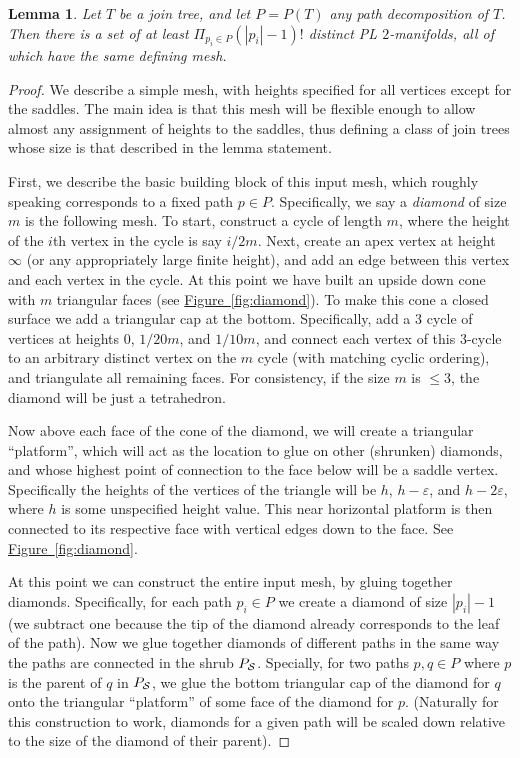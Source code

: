 \documentclass[11pt]{article}
\newtheorem{lemma}[theorem]{Lemma}
\theoremstyle{definition}
\newcommand{\eps}{\varepsilon}
\newcommand{\Fig}[1]{\hyperref[fig:#1]{Figure~\ref*{fig:#1}}} %
\begin{document}
\begin{lemma}
\label{lem:pathDecomp}
Let $T$ be a join tree, and let $P = P(T)$ any path decomposition of $T$.  %
Then there is a set of at least $\Pi_{p_i\in P} (|p_i|-1)!$ distinct PL $2$-manifolds, all of which have the same defining mesh.
\end{lemma}
\begin{proof}
 We describe a simple mesh, with heights specified for all vertices except for the saddles.  The main idea is that 
 this mesh will be flexible enough to allow almost any assignment of heights to the saddles, thus defining a class of join trees 
 whose size is that described in the lemma statement.
 
 First, we describe the basic building block of this input mesh, which roughly speaking corresponds to a fixed path $p\in P$.  
 Specifically, we say a \emph{diamond} of size $m$ is the following mesh.  To start, construct a cycle 
 of length $m$, where the height of the $i$th vertex in the cycle is say $i/2m$.  Next, create an apex vertex at height 
 $\infty$ (or any appropriately large finite height), and add an edge between this vertex and each vertex in the cycle.  At this point 
 we have built an upside down cone with $m$ triangular faces (see \Fig{diamond}). To make this cone a closed surface we add a triangular cap at the bottom. 
 Specifically, add a $3$ cycle of vertices at heights $0$, $1/20m$, and $1/10m$, and connect each vertex of this $3$-cycle to an arbitrary distinct 
 vertex on the $m$ cycle (with matching cyclic ordering), and triangulate all remaining faces.  For consistency, if the size $m$ is $\leq 3$, the diamond 
 will be just a tetrahedron.
 
 Now above each face of the cone of the diamond, we will create a triangular ``platform'', which will act as the location to glue on other (shrunken) diamonds, 
 and whose highest point of connection to the face below will be a saddle vertex.  Specifically the heights of the vertices of the triangle will be $h$, $h-\eps$, and $h-2\eps$, where 
 $h$ is some unspecified height value.  This near horizontal platform is then connected to its respective face with vertical edges down to the face. See \Fig{diamond}.
 
 At this point we can construct the entire input mesh, by gluing together diamonds.  
 Specifically, for each path $p_i\in P$ we create a diamond of size $|p_i|-1$ (we subtract one because the tip of the diamond already corresponds to the leaf of the path).
 Now we glue together diamonds of different paths in the same way the paths are connected in the shrub $P_{\mathcal{S}}$.  Specially, for two paths $p,q\in P$ where 
 $p$ is the parent of $q$ in $P_{\mathcal{S}}$, we glue the bottom triangular cap of the diamond for $q$ onto the triangular ``platform'' of some face of the diamond for $p$.
 (Naturally for this construction to work, diamonds for a given path will be scaled down relative to the size of the diamond of their parent).
 

\end{proof}
\end{document}
